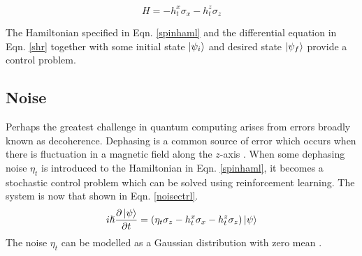 \documentclass[{../RL_for_QSP.tex}]{subfiles}
\begin{document}
\begin{equation}\label{spinhaml}
    H = -h^x_t\sigma_x - h^z_t\sigma_z
\end{equation}

The Hamiltonian specified in Eqn. \ref{spinhaml} and the differential equation in Eqn. \ref{shr} together with some initial state $\ket{\psi_i}$ and desired state $\ket{\psi_f}$ provide a control problem. 

\subsection{Noise}

Perhaps the greatest challenge in quantum computing arises from errors broadly known as decoherence. Dephasing is a common source of error which occurs when there is fluctuation in a magnetic field along the $z$-axis \cite{w2007quantum}. When some dephasing noise $\eta_t$ is introduced to the Hamiltonian in Eqn. \ref{spinhaml}, it becomes a stochastic control problem which can be solved using reinforcement learning. The system is now that shown in Eqn. \ref{noisectrl}.
\begin{equation}\label{noisectrl}
     i \hslash \frac{\partial \ket{\psi}}{\partial t} = (\eta_t \sigma_z -h^x_t \sigma_x - h^z_t\sigma_z) \ket{\psi}
\end{equation}
The noise $\eta_t$ can be modelled as a Gaussian distribution with zero mean \cite{Zaborniak2021}. 

\end{document}

